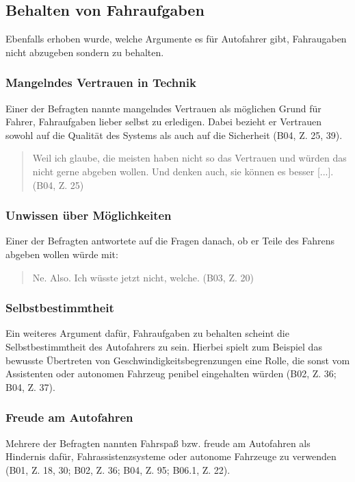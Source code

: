 \documentclass[12pt]{article}
\begin{document}
\subsection{Behalten von Fahraufgaben}
Ebenfalls erhoben wurde, welche Argumente es für Autofahrer gibt, Fahraugaben nicht abzugeben sondern zu behalten.

\subsubsection*{Mangelndes Vertrauen in Technik}
Einer der Befragten nannte mangelndes Vertrauen als möglichen Grund für Fahrer, Fahraufgaben lieber selbst zu erledigen. Dabei bezieht er Vertrauen sowohl auf die Qualität des Systems als auch auf die Sicherheit (B04, Z. 25, 39).

\begin{quote}
  Weil ich glaube, die meisten haben nicht so das Vertrauen und würden das nicht gerne abgeben wollen. Und denken auch, sie können es besser [...]. (B04, Z. 25)
\end{quote}

\subsubsection*{Unwissen über Möglichkeiten}
Einer der Befragten antwortete auf die Fragen danach, ob er Teile des Fahrens abgeben wollen würde mit:

\begin{quote}
  Ne. Also. Ich wüsste jetzt nicht, welche. (B03, Z. 20)
\end{quote}

\subsubsection*{Selbstbestimmtheit}
Ein weiteres Argument dafür, Fahraufgaben zu behalten scheint die Selbstbestimmtheit des Autofahrers zu sein. Hierbei spielt zum Beispiel das bewusste Übertreten von Geschwindigkeitsbegrenzungen eine Rolle, die sonst vom Assistenten oder autonomen Fahrzeug penibel eingehalten würden (B02, Z. 36; B04, Z. 37).

\subsubsection*{Freude am Autofahren}
Mehrere der Befragten nannten Fahrspaß bzw. freude am Autofahren als Hindernis dafür, Fahrassistenzsysteme oder autonome Fahrzeuge zu verwenden (B01, Z. 18, 30; B02, Z. 36; B04, Z. 95; B06.1, Z. 22).
\end{document}

